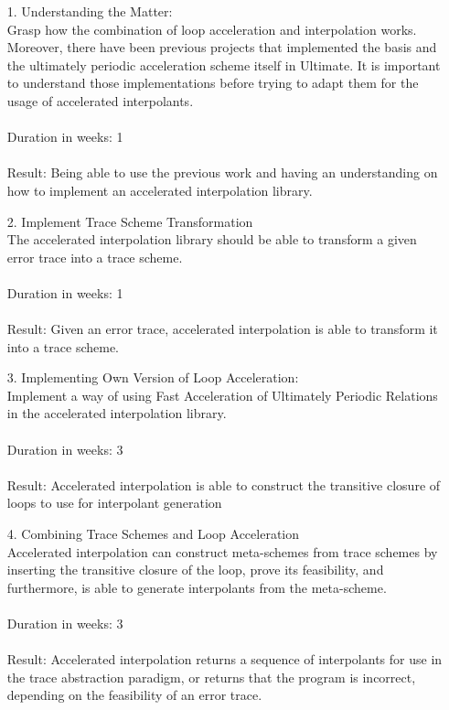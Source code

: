\documentclass{article}
\begin{document}
\begin{itemize}
	\item[1.] Understanding the Matter: \\
	Grasp how the combination of loop acceleration and interpolation works. \\
	Moreover, there have been previous projects that implemented the basis \cite{ClausThesis} and the ultimately periodic acceleration scheme itself \cite{JillThesis} in Ultimate. It is important to understand those implementations before trying to adapt them for the usage of accelerated interpolants. \\ \\
	Duration in weeks: 1 \\\\
	Result: Being able to use the previous work and having an understanding on how to implement an accelerated interpolation library.
	\item[2.] Implement Trace Scheme Transformation \\
	The accelerated interpolation library should be able to transform a given error trace into a trace scheme. \\\\
	Duration in weeks: 1 \\\\
	Result: Given an error trace, accelerated interpolation is able to transform it into a trace scheme.
	
	\item[3.] Implementing Own Version of Loop Acceleration: \\
	Implement a way of using Fast Acceleration of Ultimately Periodic Relations in the accelerated interpolation library. \\ \\
	Duration in weeks: 3 \\ \\
	Result: Accelerated interpolation is able to construct the transitive closure of loops to use for interpolant generation
	
	\item[4.] Combining Trace Schemes and Loop Acceleration \\
	Accelerated interpolation can construct meta-schemes from trace schemes by inserting the transitive closure of the loop, prove its feasibility, and furthermore, is able to generate interpolants from the meta-scheme. \\ \\
	Duration in weeks: 3 \\\\
	Result: Accelerated interpolation returns a sequence of interpolants for use in the trace abstraction paradigm, or returns that the program is incorrect, depending on the feasibility of an error trace.
	

\end{itemize}
\end{document}
